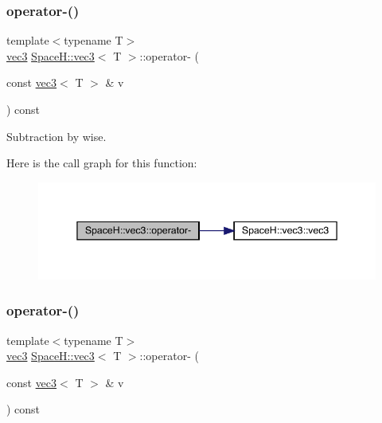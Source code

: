 \subsubsection{\texorpdfstring{operator-\/()}{operator-()}\hspace{0.1cm}{\footnotesize\ttfamily [3/11]}}
{\footnotesize\ttfamily template$<$typename T$>$ \\
\mbox{\hyperlink{struct_space_h_1_1vec3}{vec3}} \mbox{\hyperlink{struct_space_h_1_1vec3}{Space\+H\+::vec3}}$<$ T $>$\+::operator-\/ (\begin{DoxyParamCaption}\item[{const \mbox{\hyperlink{struct_space_h_1_1vec3}{vec3}}$<$ T $>$ \&}]{v }\end{DoxyParamCaption}) const\hspace{0.3cm}{\ttfamily [inline]}}



Subtraction by wise. 

Here is the call graph for this function\+:
\nopagebreak
\begin{figure}[H]
\begin{center}
\leavevmode
\includegraphics[width=345pt]{struct_space_h_1_1vec3_a8af5f368ccbf70d24d528592acfc6278_cgraph}
\end{center}
\end{figure}
\mbox{\label{struct_space_h_1_1vec3_a8af5f368ccbf70d24d528592acfc6278}} 
\subsubsection{\texorpdfstring{operator-\/()}{operator-()}\hspace{0.1cm}{\footnotesize\ttfamily [4/11]}}
{\footnotesize\ttfamily template$<$typename T$>$ \\
\mbox{\hyperlink{struct_space_h_1_1vec3}{vec3}} \mbox{\hyperlink{struct_space_h_1_1vec3}{Space\+H\+::vec3}}$<$ T $>$\+::operator-\/ (\begin{DoxyParamCaption}\item[{const \mbox{\hyperlink{struct_space_h_1_1vec3}{vec3}}$<$ T $>$ \&}]{v }\end{DoxyParamCaption}) const\hspace{0.3cm}{\ttfamily [inline]}}



